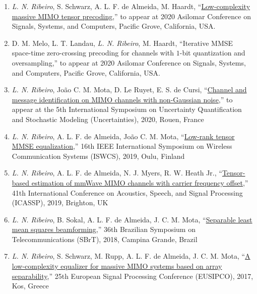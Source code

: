 \begin{enumerate}

	\item \emph{L. N. Ribeiro}, S. Schwarz, A. L. F. de Almeida, M. Haardt, ``\href{https://arxiv.org/abs/2009.09729}{Low-complexity massive MIMO tensor precoding},'' to appear at 2020 Asilomar Conference on Signals, Systems, and Computers, Pacific Grove, California, USA.

	\item D. M. Melo, L. T. Landau, \emph{L. N. Ribeiro}, M. Haardt, ``Iterative MMSE space-time zero-crossing precoding for channels with $1$-bit quantization and oversampling,'' to appear at 2020 Asilomar Conference on Signals, Systems, and Computers, Pacific Grove, California, USA.

	\item \emph{L. N. Ribeiro}, Jo\~ao C. M. Mota, D. Le Ruyet, E. S. de Cursi, ``\href{https://www5.tu-ilmenau.de/nt/generic/paper_pdfs/Ribeiro2020.pdf}{Channel and message identification on MIMO channels with non-Gaussian noise},'' to appear at the 5th International Symposium on Uncertainty Quantification and Stochastic Modeling (Uncertainties), 2020, Rouen, France
	
	\item \emph{L. N. Ribeiro}, A. L. F. de Almeida, Jo\~ao C. M. Mota, ``\href{https://arxiv.org/abs/1912.08317}{Low-rank tensor MMSE equalization},'' 16th IEEE International Symposium on Wireless Communication Systems (ISWCS), 2019, Oulu, Finland
	
	\item \emph{L. N. Ribeiro}, A. L. F. de Almeida, N. J. Myers, R. W. Heath Jr., ``\href{https://doi.org/10.1109/ICASSP.2019.8683496}{Tensor-based estimation of mmWave MIMO channels with carrier frequency offset},'' 41th International Conference on Acoustics, Speech, and Signal Processing (ICASSP), 2019, Brighton, UK
	
	\item \emph{L. N. Ribeiro}, B. Sokal, A. L. F. de Almeida, J. C. M. Mota, ``\href{https://github.com/lnribeiro/lnribeiro.github.io/blob/master/assets/pdf/sbrt18.pdf}{Separable least mean squares beamforming},'' 36th Brazilian Symposium on Telecommunications (SBrT), 2018, Campina Grande, Brazil
	
	\item \emph{L. N. Ribeiro}, S. Schwarz, M. Rupp, A. L. F. de Almeida, J. C. M. Mota, ``\href{https://doi.org/10.23919/EUSIPCO.2017.8081651}{A low-complexity equalizer for massive MIMO systems based on array separability},'' 25th European Signal Processing Conference (EUSIPCO), 2017, Kos, Greece
	

\end{enumerate}

